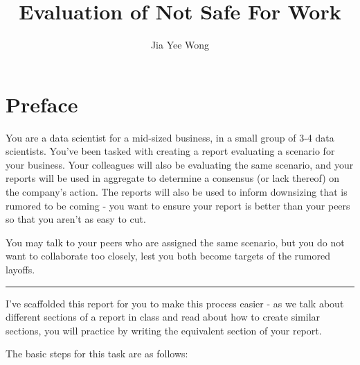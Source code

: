 \documentclass[
  letterpaper,
  DIV=11,
  numbers=noendperiod]{scrreprt}
\title{Evaluation of Not Safe For Work}
\author{Jia Yee Wong}
\date{}
\renewcommand*\contentsname{Table of contents}
\newcommand\contentsname{Table of contents}
\begin{document}
\maketitle

\renewcommand*\contentsname{Table of contents}
{
\hypersetup{linkcolor=}
\setcounter{tocdepth}{2}
\tableofcontents
}


\chapter*{Preface}\label{preface}


You are a data scientist for a mid-sized business, in a small group of
3-4 data scientists. You've been tasked with creating a report
evaluating a scenario for your business. Your colleagues will also be
evaluating the same scenario, and your reports will be used in aggregate
to determine a consensus (or lack thereof) on the company's action. The
reports will also be used to inform downsizing that is rumored to be
coming - you want to ensure your report is better than your peers so
that you aren't as easy to cut.

You may talk to your peers who are assigned the same scenario, but you
do not want to collaborate too closely, lest you both become targets of
the rumored layoffs.

\begin{center}\rule{0.5\linewidth}{0.5pt}\end{center}

I've scaffolded this report for you to make this process easier - as we
talk about different sections of a report in class and read about how to
create similar sections, you will practice by writing the equivalent
section of your report.

The basic steps for this task are as follows:
\end{document}
